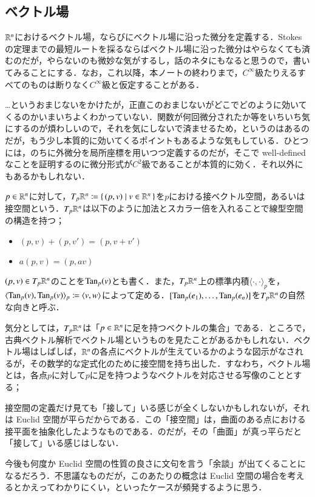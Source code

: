 \subsection{ベクトル場}

$\mathbb{R}^n$におけるベクトル場，ならびにベクトル場に沿った微分を定義する．Stokes の定理までの最短ルートを採るならばベクトル場に沿った微分はやらなくても済むのだが，やらないのも微妙な気がするし，話のネタにもなると思うので，書いてみることにする．なお，これ以降，本ノートの終わりまで，$C^\infty$級たりえるすべてのものは断りなく$C^\infty$級と仮定することがある．


\begin{que}[**]
…というおまじないをかけたが，正直このおまじないがどこでどのように効いてくるのかいまいちよくわかっていない．関数が何回微分されたか等をいちいち気にするのが煩わしいので，それを気にしないで済ませるため，というのはあるのだが，もう少し本質的に効いてくるポイントもあるような気もしている．ひとつには，のちに外微分を局所座標を用いつつ定義するのだが，そこで well-defined なことを証明するのに微分形式が$C^2$級であることが本質的に効く．それ以外にもあるかもしれない．
\end{que}

\begin{defi}
$p \in \mathbb{R}^n$に対して，$T_p \mathbb{R}^n \coloneqq \set{(p,v)| v \in \mathbb{R}^n}$を$p$における接ベクトル空間，あるいは接空間という．$T_p \mathbb{R}^n$は以下のように加法とスカラー倍を入れることで線型空間の構造を持つ；
\begin{itemize}
\item $(p, v) + (p, v') = (p, v+v')$
\item $a(p,v) = (p, av)$
\end{itemize}
$(p,v) \in T_p \mathbb{R}^n$のことを$\operatorname{Tan}_p(v)$とも書く．また，$T_p \mathbb{R}^n$上の標準内積$\langle \cdot, \cdot \rangle_p$を，$\langle \operatorname{Tan}_p(v), \operatorname{Tan}_p(v) \rangle_p \coloneqq \langle v, w \rangle$によって定める．$[\operatorname{Tan}_p(e_1), \dots, \operatorname{Tan}_p(e_n)]$を$T_p \mathbb{R}^n$の自然な向きと呼ぶ．
\end{defi}

気分としては，$T_p \mathbb{R}^n$は「$p \in \mathbb{R}^n$に足を持つベクトルの集合」である．ところで，古典ベクトル解析でベクトル場というものを見たことがあるかもしれない．ベクトル場はしばしば，$\mathbb{R}^n$の各点にベクトルが生えているかのような図示がなされるが，その数学的な定式化のために接空間を持ち出した．すなわち，ベクトル場とは，各点$p$に対して$p$に足を持つようなベクトルを対応させる写像のこととする；

\begin{dig}
接空間の定義だけ見ても「接して」いる感じが全くしないかもしれないが，それは Euclid 空間が平らだからである．この「接空間」は，曲面のある点における接平面を抽象化したようなものである．のだが，その「曲面」が真っ平らだと「接して」いる感じはしない．

今後も何度か Euclid 空間の性質の良さに文句を言う「余談」が出てくることになるだろう．不思議なものだが，このあたりの概念は Euclid 空間の場合を考えるとかえってわかりにくい，といったケースが頻発するように思う．
\end{dig}

